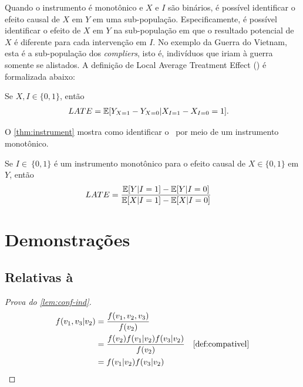 Quando o instrumento é monotônico e
$X$ e $I$ são binários, é
possível identificar o efeito causal de
$X$ em $Y$ em uma sub-população.
Especificamente, é possível identificar
o efeito de $X$ em $Y$ na sub-população em que
o resultado potencial de $X$ é
diferente para cada intervenção em $I$.
No exemplo da Guerra do Vietnam,
esta é a sub-população dos \textit{compliers}, isto é,
indivíduos que iriam à guerra somente se alistados.
A definição de Local Average Treatment Effect (\LACE)
é formalizada abaixo:

\begin{definition}
 \label{def:lace}
 Se $X, I \in \{0,1\}$, então
 \begin{align*}
  {LATE} &= {\mathbb E}[Y_{X=1}-Y_{X=0}|X_{I=1}-X_{I=0} = 1].
 \end{align*}
\end{definition}

O \cref{thm:instrument} mostra como
identificar o \LACE \ por meio de um instrumento monotônico.

\begin{theorem}
 \label{thm:instrument}
 Se $I \in\ \{0,1\}$ é um instrumento monotônico para
 o efeito causal de $X \in \{0,1\}$ em $Y$, então
 \begin{align*}
  {LATE} &= \frac{{\mathbb E}[Y|I=1]-{\mathbb E}[Y|I=0]}{{\mathbb E}[X|I=1]-{\mathbb E}[X|I=0]}
 \end{align*}
\end{theorem}




\appendix
\chapter{Demonstrações}

\section{Relativas à }

\begin{proof}[Prova do \cref{lem:conf-ind}]
 \begin{align*}
  f(v_1,v_3|v_2) 
  &= \frac{f(v_1,v_2,v_3)}{f(v_2)} \\
  &= \frac{f(v_2)f(v_1|v_2)f(v_3|v_2)}{f(v_2)} 
  & \text{\cref{def:compativel}} \\
  &= f(v_1|v_2)f(v_3|v_2)
 \end{align*}
\end{proof}

